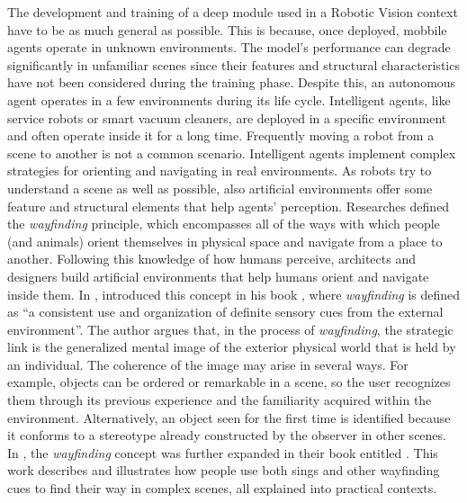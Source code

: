 The development and training of a deep module used in a Robotic Vision context have to be as much general as possible. This is because, once deployed, mobbile agents operate in unknown environments. The model's performance can degrade significantly in unfamiliar scenes since their features and structural characteristics have not been considered during the training phase. Despite this, an autonomous agent operates in a few environments during its life cycle. Intelligent agents, like service robots or smart vacuum cleaners, are deployed in a specific environment and often operate inside it for a long time. Frequently moving a robot from a scene to another is not a common scenario. Intelligent agents implement complex strategies for orienting and navigating in real environments. As robots try to understand a scene as well as possible, also artificial environments offer some feature and structural elements that help agents' perception. Researches defined the \textit{wayfinding} principle, which encompasses all of the ways with which people (and animals) orient themselves in physical space and navigate from a place to another. Following this knowledge of how humans perceive, architects and designers build artificial environments that help humans orient and navigate inside them. In \citeyear{imageofcity}, \citeauthor{imageofcity} introduced this concept in his book , where \textit{wayfinding} is defined as ``a consistent use and organization of definite sensory cues from the external environment''.  The author argues that, in the process of \textit{wayfinding}, the strategic link is the generalized mental image of the exterior physical world that is held by an individual. The coherence of the image may arise in several ways. For example, objects can be ordered or remarkable in a scene, so the user recognizes them through its previous experience and the familiarity acquired within the environment. Alternatively, an object seen for the first time is identified because it
conforms to a stereotype already constructed by the observer in other scenes. In \citeyear{wayfinding}, the \textit{wayfinding} concept was further expanded in their book entitled  \cite{wayfinding}. This work describes and illustrates how people use both sings and other wayfinding cues to find their way in complex scenes, all explained into practical contexts. 
